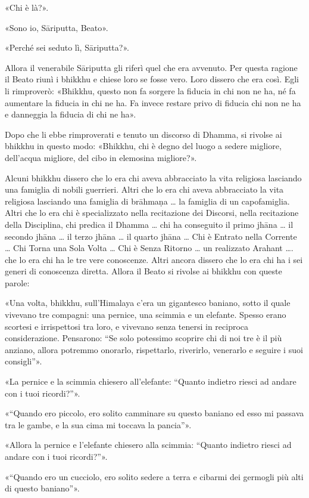 «Chi è là?».


«Sono io, Sāriputta, Beato».


«Perché sei seduto lì, Sāriputta?».


Allora il venerabile Sāriputta gli riferì quel che era avvenuto. Per
questa ragione il Beato riunì i bhikkhu e chiese loro se fosse vero.
Loro dissero che era così. Egli li rimproverò: «Bhikkhu, questo non fa
sorgere la fiducia in chi non ne ha, né fa aumentare la fiducia in chi
ne ha. Fa invece restare privo di fiducia chi non ne ha e danneggia la
fiducia di chi ne ha».


Dopo che li ebbe rimproverati e tenuto un discorso di Dhamma, si rivolse
ai bhikkhu in questo modo: «Bhikkhu, chi è degno del luogo a sedere
migliore, dell’acqua migliore, del cibo in elemosina migliore?».


Alcuni bhikkhu dissero che lo era chi aveva abbracciato la vita
religiosa lasciando una famiglia di nobili guerrieri. Altri che lo era
chi aveva abbracciato la vita religiosa lasciando una famiglia di
brāhmaṇa … la famiglia di un capofamiglia. Altri che lo era chi è
specializzato nella recitazione dei Discorsi, nella recitazione della
Disciplina, chi predica il Dhamma … chi ha conseguito il primo jhāna …
il secondo jhāna … il terzo jhāna … il quarto jhāna … Chi è Entrato
nella Corrente … Chi Torna una Sola Volta … Chi è Senza Ritorno … un
realizzato Arahant …. che lo era chi ha le tre vere conoscenze. Altri
ancora dissero che lo era chi ha i sei generi di conoscenza diretta.
Allora il Beato si rivolse ai bhikkhu con queste parole:


«Una volta, bhikkhu, sull’Himalaya c’era un gigantesco baniano, sotto il
quale vivevano tre compagni: una pernice, una scimmia e un elefante.
Spesso erano scortesi e irrispettosi tra loro, e vivevano senza tenersi
in reciproca considerazione. Pensarono: “Se solo potessimo scoprire chi
di noi tre è il più anziano, allora potremmo onorarlo, rispettarlo,
riverirlo, venerarlo e seguire i suoi consigli”».


«La pernice e la scimmia chiesero all’elefante: “Quanto indietro riesci
ad andare con i tuoi ricordi?”».


«“Quando ero piccolo, ero solito camminare su questo baniano ed esso mi
passava tra le gambe, e la sua cima mi toccava la pancia”».


«Allora la pernice e l’elefante chiesero alla scimmia: “Quanto indietro
riesci ad andare con i tuoi ricordi?”».


«“Quando ero un cucciolo, ero solito sedere a terra e cibarmi dei
germogli più alti di questo baniano”».


